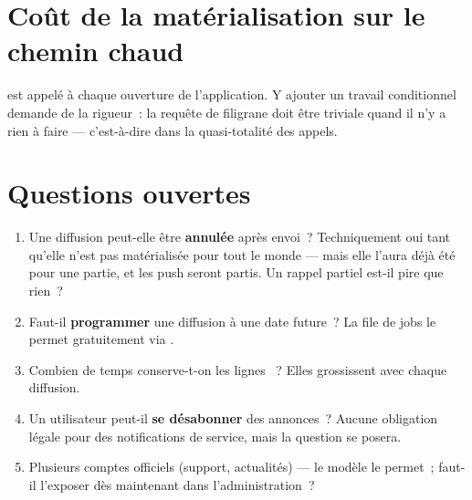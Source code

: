 \section{Coût de la matérialisation sur le chemin chaud}

 est appelé à chaque ouverture de l'application. Y ajouter un
travail conditionnel demande de la rigueur~: la requête de filigrane doit être triviale quand
il n'y a rien à faire --- c'est-à-dire dans la quasi-totalité des appels.

\section{Questions ouvertes}

\begin{enumerate}[leftmargin=1.6em]
  \item Une diffusion peut-elle être \textbf{annulée} après envoi~? Techniquement oui tant
        qu'elle n'est pas matérialisée pour tout le monde --- mais elle l'aura déjà été pour
        une partie, et les push seront partis. Un rappel partiel est-il pire que rien~?
  \item Faut-il \textbf{programmer} une diffusion à une date future~? La file de jobs le
        permet gratuitement via .
  \item Combien de temps conserve-t-on les lignes ~? Elles
        grossissent avec chaque diffusion.
  \item Un utilisateur peut-il \textbf{se désabonner} des annonces~? Aucune obligation légale
        pour des notifications de service, mais la question se posera.
  \item Plusieurs comptes officiels (support, actualités) --- le modèle le permet~; faut-il
        l'exposer dès maintenant dans l'administration~?
\end{enumerate}

